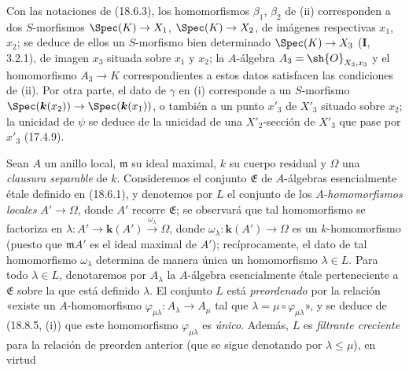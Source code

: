 Con las notaciones de (18.6.3), los homomorfismos $\beta_1$, $\beta_2$ de (ii) corresponden a dos $S$-morfismos $\Spec(K)\to X_1$, $\Spec(K)\to X_2$, de imágenes respectivas $x_1$, $x_2$; se deduce de ellos un $S$-morfismo bien determinado $\Spec(K)\to X_3$ (\textbf I, 3.2.1), de imagen $x_3$ situada sobre $x_1$ y $x_2$; la $A$-álgebra $A_3=\sh{O}_{X_3,x_3}$ y el homomorfismo $A_3\to K$ correspondientes a estos datos satisfacen las condiciones de (ii). Por otra parte, el dato de $\gamma$ en (i) corresponde a un $S$-morfismo $\Spec(\boldsymbol{k}(x_2))\to\Spec(\boldsymbol{k}(x_1))$, o también a un punto $x'_3$ de $X'_3$ situado sobre $x_2$; la unicidad de $\psi$ se deduce de la unicidad de una $X'_2$-sección de $X'_3$ que pase por $x'_3$ (17.4.9).

\begin{env}[18.8.6]
\label{IV.18.8.6}
Sean $A$ un anillo local, $\mathfrak m$ su ideal maximal, $k$ su cuerpo residual y $\Omega$ una \emph{clausura separable} de $k$. Consideremos el conjunto $\mathfrak E$ de $A$-álgebras esencialmente étale definido en (18.6.1), y denotemos por $L$ el conjunto de los $A$-\emph{homomorfismos locales} $A'\to\Omega$, donde $A'$ recorre $\mathfrak E$; se observará que tal homomorfismo se factoriza en
$\lambda:A'\longrightarrow\boldsymbol{k}(A')\xrightarrow{\omega_\lambda}\Omega$,
donde $\omega_\lambda:\boldsymbol{k}(A')\to\Omega$ es un $k$-homomorfismo (puesto que $\mathfrak mA'$ es el ideal maximal de $A'$); recíprocamente, el dato de tal homomorfismo $\omega_\lambda$ determina de manera única un homomorfismo $\lambda\in L$. Para todo $\lambda\in L$, denotaremos por $A_\lambda$ la $A$-álgebra esencialmente étale perteneciente a $\mathfrak E$ sobre la que está definido $\lambda$. El conjunto $L$ está \emph{preordenado} por la relación «existe un $A$-homomorfismo $\varphi_{\mu\lambda}:A_\lambda\to A_\mu$ tal que $\lambda=\mu\circ\varphi_{\mu\lambda}$», y se deduce de (18.8.5, (i)) que este homomorfismo $\varphi_{\mu\lambda}$ es \emph{único}. Además, $L$ es \emph{filtrante creciente} para la relación de preorden anterior (que se sigue denotando por $\lambda\leq\mu$), en virtud



\end{env}
